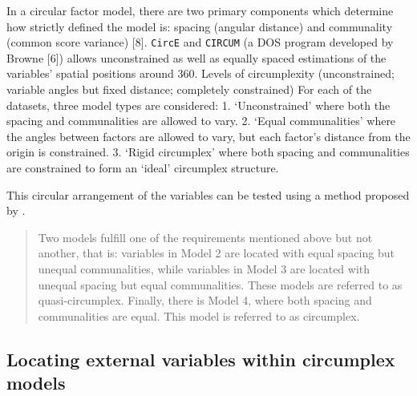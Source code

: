 \documentclass[
  authoryear,
  preprint,
  3p]{elsarticle}
\begin{document}
In a circular factor model, there are two primary components which
determine how strictly defined the model is: spacing (angular distance)
and communality (common score variance) {[}8{]}. \texttt{CircE} and
\texttt{CIRCUM} (a DOS program developed by Browne {[}6{]}) allows
unconstrained as well as equally spaced estimations of the variables'
spatial positions around 360. Levels of circumplexity (unconstrained;
variable angles but fixed distance; completely constrained) For each of
the datasets, three model types are considered: 1. `Unconstrained' where
both the spacing and communalities are allowed to vary. 2. `Equal
communalities' where the angles between factors are allowed to vary, but
each factor's distance from the origin is constrained. 3. `Rigid
circumplex' where both spacing and communalities are constrained to form
an `ideal' circumplex structure.

This circular arrangement of the variables can be tested using a method
proposed by \citet{Rounds2000Tinsley}.

\begin{quote}
Two models fulfill one of the requirements mentioned above but not
another, that is: variables in Model 2 are located with equal spacing
but unequal communalities, while variables in Model 3 are located with
unequal spacing but equal communalities. These models are referred to as
quasi-circumplex. Finally, there is Model 4, where both spacing and
communalities are equal. This model is referred to as circumplex.
\end{quote}

\subsection{Locating external variables within circumplex
models}\label{locating-external-variables-within-circumplex-models}
\end{document}
